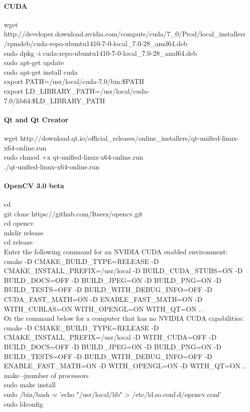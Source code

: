\paragraph{CUDA}
\begin{sBox}
	wget http://developer.download.nvidia.com/compute/cuda/7\_0/Prod/local\_installers/rpmdeb/cuda-repo-ubuntu1410-7-0-local\_7.0-28\_amd64.deb\\
	sudo dpkg -i cuda-repo-ubuntu1410-7-0-local\_7.0-28\_amd64.deb\\
	sudo apt-get update\\
	sudo apt-get install cuda\\
	export PATH=/usr/local/cuda-7.0/bin:\$PATH\\
	export LD\_LIBRARY\_PATH=/usr/local/cuda-7.0/lib64:\$LD\_LIBRARY\_PATH\
\end{sBox}  
 
\paragraph{Qt and Qt Creator}
\begin{sBox}
	wget http://download.qt.io/official\_releases/online\_installers/qt-unified-linux-x64-online.run\\
	sudo chmod +x qt-unified-linux-x64-online.run\\
	./qt-unified-linux-x64-online.run\\
\end{sBox}
 
\paragraph{OpenCV 3.0 beta}
\begin{sBox}
	cd \~\\   
	git clone https://github.com/Itseez/opencv.git\\
	cd opencv\\
	mkdir release\\
	cd release\\
	Enter the following command for an NVIDIA CUDA enabled environment:\\
	cmake -D CMAKE\_BUILD\_TYPE=RELEASE -D CMAKE\_INSTALL\_PREFIX=/usr/local -D BUILD\_CUDA\_STUBS=ON -D BUILD\_DOCS=OFF -D BUILD\_JPEG=ON -D BUILD\_PNG=ON -D BUILD\_TESTS=OFF -D BUILD\_WITH\_DEBUG\_INFO=OFF -D CUDA\_FAST\_MATH=ON -D ENABLE\_FAST\_MATH=ON -D WITH\_CUBLAS=ON WITH\_OPENGL=ON WITH\_QT=ON ..\\
	Or the command below for a computer that has no NVIDIA CUDA capabilities:\\  
	cmake -D CMAKE\_BUILD\_TYPE=RELEASE -D CMAKE\_INSTALL\_PREFIX=/usr/local -D WITH\_CUDA=OFF -D BUILD\_DOCS=OFF -D BUILD\_JPEG=ON -D BUILD\_PNG=ON -D BUILD\_TESTS=OFF -D BUILD\_WITH\_DEBUG\_INFO=OFF -D ENABLE\_FAST\_MATH=ON -D WITH\_OPENGL=ON -D WITH\_QT=ON ..\\
	make -jnumber of processors\\
	sudo make install\\
	sudo /bin/bash -c 'echo "/usr/local/lib" > /etc/ld.so.conf.d/opencv.conf'\\
	sudo ldconfig\\
\end{sBox}  
  
